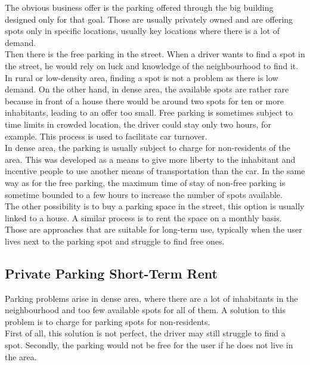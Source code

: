 \documentclass[12pt,a4paper,oneside]{book}
\begin{document}
The obvious business offer is the parking offered through the big building designed only for that goal. Those are usually privately owned and are offering spots only in specific locations, usually key locations where there is a lot of demand.\\

Then there is the free parking in the street. When a driver wants to find a spot in the street, he would rely on luck and knowledge of the neighbourhood to find it. In rural or low-density area, finding a spot is not a problem as there is low demand. On the other hand, in dense area, the available spots are rather rare because in front of a house there would be around two spots for ten or more inhabitants, leading to an offer too small. Free parking is sometimes subject to time limits in crowded location, the driver could stay only two hours, for example. This process is used to facilitate car turnover.\\

In dense area, the parking is usually subject to charge for non-residents of the area. This was developed as a means to give more liberty to the inhabitant and incentive people to use another means of transportation than the car. In the same way as for the free parking, the maximum time of stay of non-free parking is sometime bounded to a few hours to increase the number of spots available.\cite{bxpay} \\

The other possibility is to buy a parking space in the street, this option is usually linked to a house. A similar process is to rent the space on a monthly basis. Those are approaches that are suitable for long-term use, typically when the user lives next to the parking spot and struggle to find free ones.

\subsection{Private Parking Short-Term Rent}
Parking problems arise in dense area, where there are a lot of inhabitants in the neighbourhood and too few available spots for all of them. A solution to this problem is to charge for parking spots for non-residents.\\

First of all, this solution is not perfect, the driver may still struggle to find a spot. Secondly, the parking would not be free for the user if he does not live in the area.\\
\end{document}
